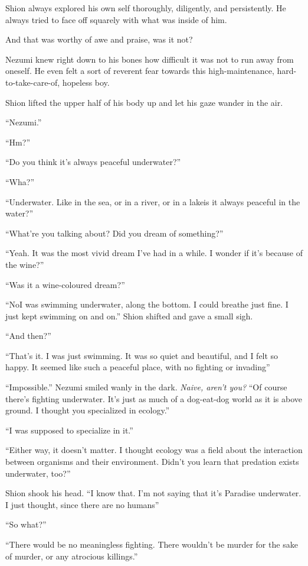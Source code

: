 Shion always explored his own self thoroughly, diligently, and
persistently. He always tried to face off squarely with what was inside
of him.

And that was worthy of awe and praise, was it not?

Nezumi knew right down to his bones how difficult it was not to run away
from oneself. He even felt a sort of reverent fear towards this
high-maintenance, hard-to-take-care-of, hopeless boy.

Shion lifted the upper half of his body up and let his gaze wander in
the air.

``Nezumi.''

``Hm?''

``Do you think it's always peaceful underwater?''

``Wha?''

``Underwater. Like in the sea, or in a river, or in a lake\el is it
always peaceful in the water?''

``What're you talking about? Did you dream of something?''

``Yeah. It was the most vivid dream I've had in a while. I wonder if
it's because of the wine?''

``Was it a wine-coloured dream?''

``No\el I was swimming underwater, along the bottom. I could breathe
just fine. I just kept swimming on and on.'' Shion shifted and gave a
small sigh.

``And then?''

``That's it. I was just swimming. It was so quiet and beautiful, and I
felt so happy. It seemed like such a peaceful place, with no fighting or
invading\el ''

``Impossible.'' Nezumi smiled wanly in the dark. \emph{Naive, aren't you?}
``Of course there's fighting underwater. It's just as much of a
dog-eat-dog world as it is above ground. I thought you specialized in
ecology.''

``I was supposed to specialize in it.''

``Either way, it doesn't matter. I thought ecology was a field about the
interaction between organisms and their environment. Didn't you learn
that predation exists underwater, too?''

Shion shook his head. ``I know that. I'm not saying that it's Paradise
underwater. I just thought, since there are no humans\el ''

``So what?''

``There would be no meaningless fighting. There wouldn't be murder for
the sake of murder, or any atrocious killings.''

